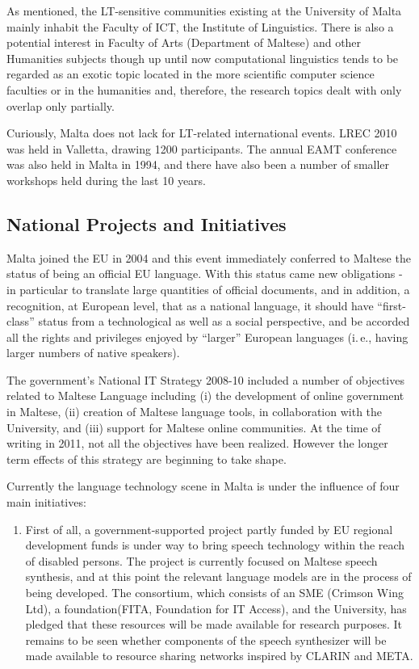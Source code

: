 \documentclass[]{../../metanetpaper}
\begin{document}
\begin{multicols}{2}
As mentioned, the LT-sensitive communities existing at the University of Malta mainly inhabit the Faculty of ICT, the Institute of Linguistics. There is also a potential interest in Faculty of Arts (Department of Maltese) and other Humanities subjects though up until now computational linguistics tends to be regarded as an exotic topic located in the more scientific computer science faculties or in the humanities and, therefore, the research topics dealt with only overlap only partially.

Curiously, Malta does not lack for LT-related international events. LREC 2010 was held in Valletta, drawing 1200 participants. The annual EAMT conference was also held in Malta in 1994, and there have also been a number of smaller workshops held during the last 10 years.

\subsection{National Projects and Initiatives}

Malta joined the EU in 2004 and this event immediately conferred to Maltese the status of being an official EU language. With this status came new obligations - in particular to translate large quantities of official documents, and in addition, a recognition, at European level, that as a national language, it should have ``first-class'' status from a technological as well as a social perspective, and be accorded all the rights and privileges enjoyed by ``larger'' European languages (i.\,e., having larger numbers of native speakers). 

The government’s National IT Strategy 2008-10 included a number of objectives related to Maltese Language including (i) the development of online government in Maltese, (ii) creation of Maltese language tools, in collaboration with the University, and (iii) support for Maltese online communities. At the time of writing in 2011, not all the objectives have been realized. However the longer term effects of this strategy are beginning to take shape. 

Currently the language technology scene in Malta is under the influence of four main initiatives:
\begin{enumerate}
\item First of all, a government-supported project partly funded by EU regional development funds is under way to bring speech technology within the reach of disabled persons. The project is currently focused on Maltese speech synthesis, and at this point the relevant language models are in the process of being developed. The consortium, which consists of an SME (Crimson Wing Ltd), a foundation(FITA, Foundation for IT Access), and the University, has pledged that these resources will be made available for research purposes. It remains to be seen whether components of the speech synthesizer will be made available to resource sharing networks inspired by CLARIN and META.


\end{enumerate}
\end{multicols}
\end{document}
